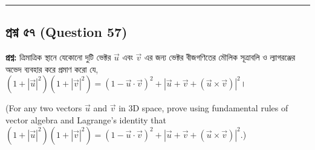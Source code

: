 \documentclass[12pt]{article}
\begin{document}
\vspace{0.8cm}

\noindent\rule{\textwidth}{1pt}
\subsection*{প্রশ্ন ৫৭ (Question 57)}

\textbf{প্রশ্ন:} ত্রিমাত্রিক স্থানে যেকোনো দুটি ভেক্টর $\vec{u}$ এবং $\vec{v}$ এর জন্য ভেক্টর বীজগণিতের মৌলিক সূত্রাবলি ও ল্যাগরঞ্জের অভেদ ব্যবহার করে প্রমাণ করো যে, $(1 + |\vec{u}|^2)(1 + |\vec{v}|^2) = (1 - \vec{u} \cdot \vec{v})^2 + |\vec{u} + \vec{v} + (\vec{u} \times \vec{v})|^2$।

(For any two vectors $\vec{u}$ and $\vec{v}$ in 3D space, prove using fundamental rules of vector algebra and Lagrange's identity that $(1 + |\vec{u}|^2)(1 + |\vec{v}|^2) = (1 - \vec{u} \cdot \vec{v})^2 + |\vec{u} + \vec{v} + (\vec{u} \times \vec{v})|^2$.)

\begin{center}
\end{center}
\end{document}
